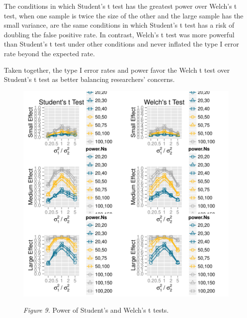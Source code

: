 \documentclass[man,a4paper,noextraspace,apacite]{apa6}
\begin{document}
    The conditions in which Student's t test has the greatest power over Welch's t test, when one sample is twice the size of the other and the large sample has the small variance, are the same conditions in which Student's t test has a risk of doubling the false positive rate. In contrast, Welch's t test was more powerful than Student's t test under other conditions and never inflated the type I error rate beyond the expected rate.

    Taken together, the type I error rates and power favor the Welch t test over Student's t test as better balancing researchers' concerns.
\begin{figure}
\includegraphics{WelchManuscript-abridged-plotPower}

\textit{Figure 9.} Power of Student's and Welch's t tests.
\end{figure}
\end{document}
